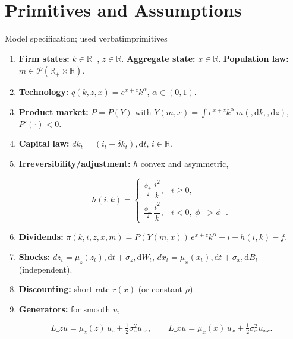 ﻿\documentclass[11pt,letterpaper,oneside]{article}
\numberwithin{equation}{section}
\newcommand{\printacronyms}{}
\newcommand{\R}{\mathbb{R}}
\newcommand{\1}{\mathbf{1}}
\newcommand{\diff}{,\mathrm{d}}
\newcommand{\Lz}{L\_z}
\newcommand{\Lx}{L\_x}
\newcommand{\YY}{Y(m,x)}
\begin{document}
\printacronyms

\section{Primitives and Assumptions}

\begin{assumption}{Model specification; used verbatim}{primitives}
\begin{enumerate}[label=(\roman*),itemsep=0.25em]
\item \textbf{Firm states:} $k\in\R_+$, $z\in\R$. \textbf{Aggregate state:} $x\in\R$. \textbf{Population law:} $m\in\mathcal P(\R_+\times\R)$.
\item \textbf{Technology:} $q(k,z,x)=e^{x+z}k^\alpha$, $\alpha\in(0,1)$.
\item \textbf{Product market:} $P=P(Y)$ with $Y(m,x)=\int e^{x+z}k^\alpha\, m(\diff k,\diff z)$, $P'(\cdot)<0$.
\item \textbf{Capital law:} $dk_t=(i_t-\delta k_t)\diff t$, $i\in\R$.
\item \textbf{Irreversibility/adjustment:} $h$ convex and asymmetric,

$$
h(i,k)=
\begin{cases}
\tfrac{\phi_+}{2}\,\dfrac{i^2}{k}, & i\ge 0,\\[3pt]
\tfrac{\phi_-}{2}\,\dfrac{i^2}{k}, & i<0,\ \phi_->\phi_+.
\end{cases}
$$

\item \textbf{Dividends:} $\pi(k,i,z,x,m)=P(\YY)\,e^{x+z}k^\alpha - i - h(i,k) - f$.
\item \textbf{Shocks:} $dz_t=\mu_z(z_t)\diff t+\sigma_z\diff W_t$, $dx_t=\mu_x(x_t)\diff t+\sigma_x\diff B_t$ (independent).
\item \textbf{Discounting:} short rate $r(x)$ (or constant $\rho$).
\item \textbf{Generators:} for smooth $u$,

$$
\Lz u=\mu_z(z)\,u_z+\tfrac12\sigma_z^2 u_{zz},\qquad
\Lx u=\mu_x(x)\,u_x+\tfrac12\sigma_x^2 u_{xx}.
$$

\end{enumerate}
\end{assumption}
\end{document}
